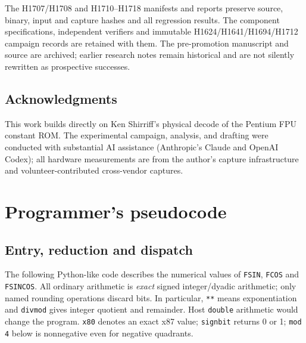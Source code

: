 \documentclass[11pt]{article}
\newcommand{\instr}[1]{\texttt{#1}}
\begin{document}
The H1707/H1708 and H1710--H1718 manifests and reports preserve source, binary, input and
capture hashes and all regression results. The component specifications,
independent verifiers and immutable H1624/H1641/H1694/H1712 campaign records are
retained with them. The pre-promotion manuscript and source are archived;
earlier research notes remain historical and are not silently rewritten
as prospective successes.

\subsection*{Acknowledgments}

This work builds directly on Ken Shirriff's physical decode of the
Pentium FPU constant ROM.  The experimental campaign, analysis, and
drafting were conducted with substantial AI assistance (Anthropic's
Claude and OpenAI Codex); all hardware measurements are from the
author's capture infrastructure and volunteer-contributed
cross-vendor captures.

\clearpage
\appendix
\section{Programmer's pseudocode}
\label{app:pseudocode}

\subsection{Entry, reduction and dispatch}

The following Python-like code describes the numerical values of
\instr{FSIN}, \instr{FCOS} and \instr{FSINCOS}. All ordinary arithmetic is
\emph{exact} signed integer/dyadic arithmetic; only named rounding operations
discard bits. In particular, \texttt{**} means exponentiation and
\texttt{divmod} gives integer quotient and remainder. Host \texttt{double}
arithmetic would change the program. \texttt{x80} denotes an exact x87 value;
\texttt{signbit} returns 0 or 1; \texttt{mod 4} below is
nonnegative even for negative quadrants.
\end{document}
